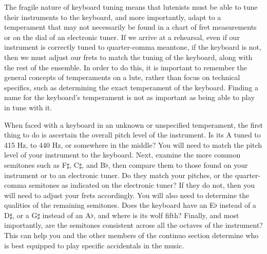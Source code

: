 The fragile nature of keyboard tuning means that lutenists must be able to tune their instruments
to the keyboard, and more importantly, adapt to a temperament that may not necessarily be found
in a chart of fret measurements or on the dial of an electronic tuner.  If we arrive at a rehearsal,
even if our instrument is correctly tuned to quarter-comma meantone, if the keyboard is not, then
we must adjust our frets to match the tuning of the keyboard, along with the rest of the ensemble.
In order to do this, it is important to remember the general concepts of temperaments on a lute,
rather than focus on technical specifics, such as determining the exact temperament of the 
keyboard.  Finding a name for the keyboard's temperament is not as important as being able to
play in tune with it.

When faced with a keyboard in an unknown or unspecified temperament, the first thing to do is
ascertain the overall pitch level of the instrument.  Is its A tuned to 415 Hz, to 440 Hz, or
somewhere in the middle?  You will need to match the pitch level of your instrument to the keyboard.
Next, examine the more common semitones such as F$\sharp$, C$\sharp$, and B$\flat$, then compare
them to those found on your instrument or to an electronic tuner.  Do they match your pitches, or
the quarter-comma semitones as indicated on the electronic tuner?  If they do not, then you will
need to adjust your frets accordingly.  You will also need to determine the qualities of the
remaining semitones.  Does the keyboard have an E$\flat$ instead of a D$\sharp$, or a G$\sharp$
instead of an A$\flat$, and where is its wolf fifth?  Finally, and most importantly, are the
semitones consistent across all the octaves of the instrument?  This can help you and the other
members of the continuo section determine who is best equipped to play specific accidentals in the
music.

